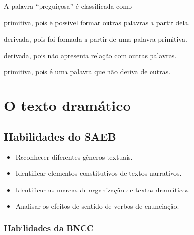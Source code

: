 A palavra ``preguiçosa'' é classificada como

\begin{escolha}[itemsep=-5pt]
\item primitiva, pois é possível formar outras palavras a partir dela.

\item derivada, pois foi formada a partir de uma palavra primitiva.

\item derivada, pois não apresenta relação com outras palavras.

\item primitiva, pois é uma palavra que não deriva de outras.
\end{escolha}


\chapter{O texto dramático}


\section{Habilidades do SAEB}

\begin{itemize}
  \item Reconhecer diferentes gêneros textuais.
  \item Identificar elementos constitutivos de textos narrativos.
  \item Identificar as marcas de organização de textos dramáticos.
  \item Analisar os efeitos de sentido de verbos de enunciação.
\end{itemize}

\subsection{Habilidades da BNCC}

